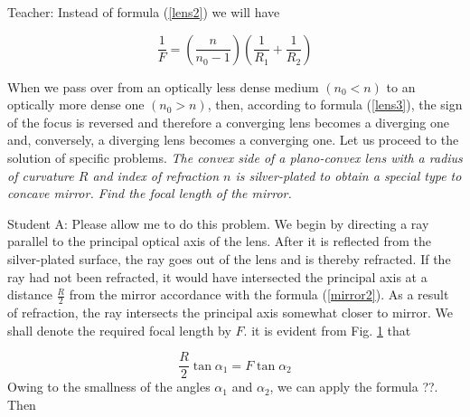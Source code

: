 \documentclass[a4paper,12pt]{book}
\begin{document}
{ {\sc Teacher:} Instead of formula (\ref{lens2}) we will have
 
 \begin{equation}
\frac{1}{F} = \left( \frac{n}{n_{0} - 1}\right) \left( \frac{1}{R_{1}} + \frac{1}{R_{2}} \right) \label{lens3}
\end{equation}

When we pass over from an optically less dense medium $(n_{0}<n)$ to an optically more dense one $(n_{0}>n)$, then, according to formula (\ref{lens3}), the sign of the focus is reversed and therefore a converging lens becomes a diverging one and, conversely, a diverging lens becomes a converging one. Let us proceed to the solution of specific problems. \emph{The convex side of a plano-convex lens with a radius of curvature $R$ and index of refraction $n$ is silver-plated to obtain a special type to concave mirror. Find the focal length of the mirror.}

{\sc Student A:} Please allow me to do this problem. We begin by directing a ray parallel to the principal optical axis of the lens. After it is reflected from the silver-plated surface, the ray goes out of the lens and is thereby refracted. If the ray had not been refracted, it would have intersected the principal axis at a distance $\frac{R}{2}$ from the mirror accordance with the formula (\ref{mirror2}). As a result of refraction, the ray intersects the principal axis somewhat closer to mirror. We shall denote the required focal length by $F$. it is evident from Fig. \ref{fig140} that 
\begin{figure}[htbp]
\begin{center}
\caption{}
\label{fig140}
\end{center}
\end{figure}

\begin{equation}
\frac{R}{2} \tan \alpha_{1} = F \tan \alpha_{2}
\end{equation}
Owing to the smallness of the angles $\alpha_{1}$ and $\alpha_{2}$, we can apply the formula {??}. Then

}
\end{document}
